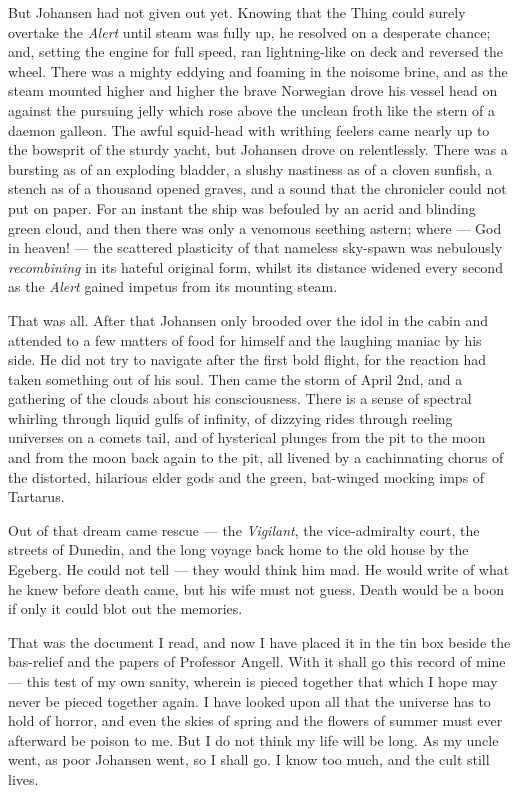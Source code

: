 \begin{pages}
\begin{Leftside}
But Johansen had not given out yet. Knowing that the Thing could surely
overtake the \emph{Alert} until steam was fully up, he resolved on a desperate
chance; and, setting the engine for full speed, ran lightning-like on
deck and reversed the wheel. There was a mighty eddying and foaming in
the noisome brine, and as the steam mounted higher and higher the brave
Norwegian drove his vessel head on against the pursuing jelly which rose
above the unclean froth like the stern of a daemon galleon. The awful
squid-head with writhing feelers came nearly up to the bowsprit of the
sturdy yacht, but Johansen drove on relentlessly. There was a bursting
as of an exploding bladder, a slushy nastiness as of a cloven sunfish, a
stench as of a thousand opened graves, and a sound that the chronicler
could not put on paper. For an instant the ship was befouled by an acrid
and blinding green cloud, and then there was only a venomous seething
astern; where --- God in heaven! --- the scattered plasticity of that
nameless sky-spawn was nebulously \emph{recombining} in its hateful original
form, whilst its distance widened every second as the \emph{Alert} gained
impetus from its mounting steam.

That was all. After that Johansen only brooded over the idol in the
cabin and attended to a few matters of food for himself and the laughing
maniac by his side. He did not try to navigate after the first bold
flight, for the reaction had taken something out of his soul. Then came
the storm of April 2nd, and a gathering of the clouds about his
consciousness. There is a sense of spectral whirling through liquid
gulfs of infinity, of dizzying rides through reeling universes on a
comets tail, and of hysterical plunges from the pit to the moon and from
the moon back again to the pit, all livened by a cachinnating chorus of
the distorted, hilarious elder gods and the green, bat-winged mocking
imps of Tartarus.

Out of that dream came rescue --- the \emph{Vigilant}, the vice-admiralty court,
the streets of Dunedin, and the long voyage back home to the old house
by the Egeberg. He could not tell --- they would think him mad. He would
write of what he knew before death came, but his wife must not guess.
Death would be a boon if only it could blot out the memories.

That was the document I read, and now I have placed it in the tin box
beside the bas-relief and the papers of Professor Angell. With it shall
go this record of mine --- this test of my own sanity, wherein is pieced
together that which I hope may never be pieced together again. I have
looked upon all that the universe has to hold of horror, and even the
skies of spring and the flowers of summer must ever afterward be poison
to me. But I do not think my life will be long. As my uncle went, as
poor Johansen went, so I shall go. I know too much, and the cult still
lives.


\end{Leftside}
\end{pages}
